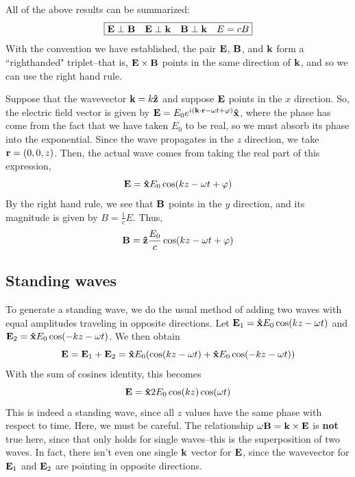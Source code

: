All of the above results can be summarized:
\[ \boxed{\mathbf{E} \perp \mathbf{B} \quad \mathbf{E} \perp \mathbf{k} \quad \mathbf{B} \perp \mathbf{k} \quad E = cB}\]
With the convention we have established, the pair $\mathbf{E}$, $\mathbf{B}$, and $\mathbf{k}$ form a ``righthanded" triplet--that is, $\mathbf{E} \times \mathbf{B}$ points in the same direction of $\mathbf{k}$, and so we can use the right hand rule.

Suppose that the wavevector $\mathbf{k} = k\mathbf{\hat{z}}$ and suppose $\mathbf{E}$ points in the $x$ direction. So, the electric field vector is given by $\mathbf{E} = E_0e^{i(\mathbf{k} \cdot \mathbf{r} - \omega t+\varphi)}\mathbf{\hat{x}}$, where the phase has come from the fact that we have taken $E_0$ to be real, so we must absorb its phase into the exponential. Since the wave propagates in the $z$ direction, we take $\mathbf{r} = (0,0,z)$. Then, the actual wave comes from taking the real part of this expression,
\[ \mathbf{E} = \mathbf{\hat{x}} E_0\cos(kz -\omega t + \varphi)\]
By the right hand rule, we see that $\mathbf{B}$ points in the $y$ direction, and its magnitude is given by $B = \frac{1}{c}E$. Thus,
\[ \mathbf{B} = \mathbf{\hat{z}} \frac{E_0}{c}\cos(kz - \omega t+\varphi) \]
\subsection*{Standing waves}
To generate a standing wave, we do the usual method of adding two waves with equal amplitudes traveling in opposite directions. Let $\mathbf{E}_1 = \mathbf{\hat{x}} E_0\cos(kz-\omega t)$ and $\mathbf{E}_2 = \mathbf{\hat{x}} E_0\cos(-kz-\omega t)$. We then obtain
\[ \mathbf{E} = \mathbf{E}_1 + \mathbf{E}_2 = \mathbf{\hat{x}} E_0(\cos(kz-\omega t)+\mathbf{\hat{x}} E_0\cos(-kz-\omega t))\]
With the sum of cosines identity, this becomes
\[ \mathbf{E} = \mathbf{\hat{x}} 2E_0\cos(kz)\cos(\omega t)\]
This is indeed a standing wave, since all $z$ values have the same phase with respect to time. Here, we must be careful. The relationship $\omega \mathbf{B} = \mathbf{k} \times \mathbf{E}$ is \textbf{not} true here, since that only holds for single waves--this is the superposition of two waves. In fact, there isn't even one single $\mathbf{k}$ vector for $\mathbf{E}$, since the wavevector for $\mathbf{E}_1$ and $\mathbf{E}_2$ are pointing in opposite directions.

